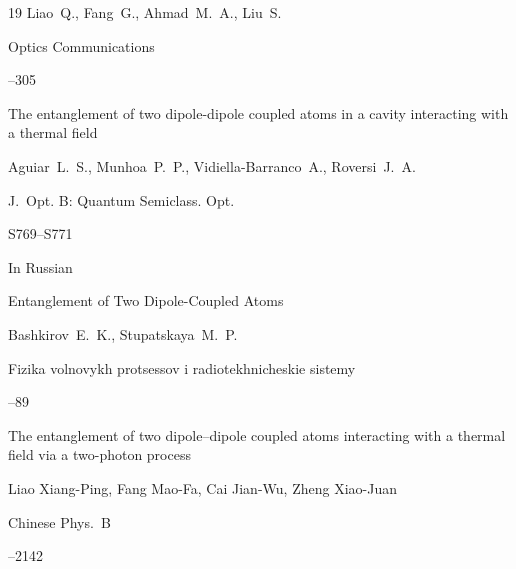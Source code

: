 \begin{thebibliography}{19}
\by  Liao~Q., Fang~G., Ahmad~M.~A.,  Liu~S.

\jour Optics Communications




--305







\paper The entanglement of two dipole-dipole coupled atoms in a cavity interacting with a thermal field

\by   Aguiar~L.~S.,  Munhoa~P.~P.,  Vidiella-Barranco~A.,  Roversi~J.~A.

\jour J.~Opt. B: Quantum Semiclass. Opt. 




\pages S769--S771





\lang In Russian

\paper Entanglement of Two Dipole-Coupled Atoms

\by Bashkirov~E.~K., Stupatskaya~M.~P.

\jour Fizika volnovykh protsessov i radiotekhnicheskie sistemy




--89






\paper The entanglement of two dipole–dipole coupled atoms interacting with a thermal field via a two-photon process 

\by   Liao Xiang-Ping, Fang Mao-Fa, Cai Jian-Wu, Zheng Xiao-Juan

\jour Chinese Phys.~B




--2142







\end{thebibliography}
